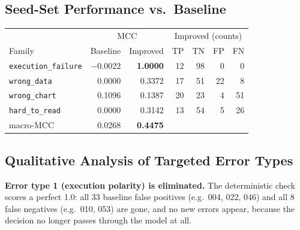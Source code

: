 \documentclass[11pt]{article}
\begin{document}
\subsection{Seed-Set Performance vs.\ Baseline}
\begin{center}
\begin{tabular}{lrrrrrr}
\toprule
& \multicolumn{2}{c}{MCC} & \multicolumn{4}{c}{Improved (counts)} \\
Family & Baseline & Improved & TP & TN & FP & FN \\
\midrule
\texttt{execution\_failure} & $-0.0022$ & \textbf{1.0000} & 12 & 98 & 0 & 0 \\
\texttt{wrong\_data} & 0.0000 & 0.3372 & 17 & 51 & 22 & 8 \\
\texttt{wrong\_chart} & 0.1096 & 0.1387 & 20 & 23 & 4 & 51 \\
\texttt{hard\_to\_read} & 0.0000 & 0.3142 & 13 & 54 & 5 & 26 \\
\midrule
macro-MCC & 0.0268 & \textbf{0.4475} & & & & \\
\bottomrule
\end{tabular}
\end{center}

\subsection{Qualitative Analysis of Targeted Error Types}
\textbf{Error type 1 (execution polarity) is eliminated.} The deterministic
check scores a perfect 1.0: all 33 baseline false positives (e.g.\ 004, 022,
046) and all 8 false negatives (e.g.\ 010, 053) are gone, and no new errors
appear, because the decision no longer passes through the model at all.
\end{document}
